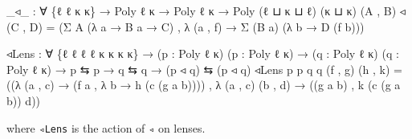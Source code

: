 \documentclass[
  11pt,
  oneside,
  article]{memoir}
\newenvironment{Shaded}{}{}
\newcommand{\NormalTok}[1]{#1}
\newcommand{\OtherTok}[1]{\textcolor[rgb]{0.00,0.44,0.13}{#1}}
\theoremstyle{definition}
\theoremstyle{plain}
\newcommand{\0}{\textsf{0}}
\newcommand{\1}{\tn{\textsf{1}}}
\begin{document}
\begin{Shaded}
\begin{Highlighting}[]
\OtherTok{\_}\NormalTok{◃}\OtherTok{\_} \OtherTok{:} \OtherTok{∀} \OtherTok{\{}\NormalTok{ℓ ℓ\textquotesingle{} κ κ\textquotesingle{}}\OtherTok{\}} \OtherTok{→}\NormalTok{ Poly ℓ κ }\OtherTok{→}\NormalTok{ Poly ℓ\textquotesingle{} κ\textquotesingle{} }\OtherTok{→}\NormalTok{ Poly }\OtherTok{(}\NormalTok{ℓ ⊔ κ ⊔ ℓ\textquotesingle{}}\OtherTok{)} \OtherTok{(}\NormalTok{κ ⊔ κ\textquotesingle{}}\OtherTok{)}
\OtherTok{(}\NormalTok{A , B}\OtherTok{)}\NormalTok{ ◃ }\OtherTok{(}\NormalTok{C , D}\OtherTok{)} \OtherTok{=} \OtherTok{(}\NormalTok{Σ A }\OtherTok{(λ}\NormalTok{ a }\OtherTok{→}\NormalTok{ B a }\OtherTok{→}\NormalTok{ C}\OtherTok{)}\NormalTok{ , }\OtherTok{λ} \OtherTok{(}\NormalTok{a , f}\OtherTok{)} \OtherTok{→}\NormalTok{ Σ }\OtherTok{(}\NormalTok{B a}\OtherTok{)} \OtherTok{(λ}\NormalTok{ b }\OtherTok{→}\NormalTok{ D }\OtherTok{(}\NormalTok{f b}\OtherTok{)))}

\NormalTok{◃Lens }\OtherTok{:} \OtherTok{∀} \OtherTok{\{}\NormalTok{ℓ ℓ\textquotesingle{} ℓ\textquotesingle{}\textquotesingle{} ℓ\textquotesingle{}\textquotesingle{}\textquotesingle{} κ κ\textquotesingle{} κ\textquotesingle{}\textquotesingle{} κ\textquotesingle{}\textquotesingle{}\textquotesingle{}}\OtherTok{\}}
        \OtherTok{→} \OtherTok{(}\NormalTok{p }\OtherTok{:}\NormalTok{ Poly ℓ κ}\OtherTok{)} \OtherTok{(}\NormalTok{p\textquotesingle{} }\OtherTok{:}\NormalTok{ Poly ℓ\textquotesingle{} κ\textquotesingle{}}\OtherTok{)} 
        \OtherTok{→} \OtherTok{(}\NormalTok{q }\OtherTok{:}\NormalTok{ Poly ℓ\textquotesingle{}\textquotesingle{} κ\textquotesingle{}\textquotesingle{}}\OtherTok{)} \OtherTok{(}\NormalTok{q\textquotesingle{} }\OtherTok{:}\NormalTok{ Poly ℓ\textquotesingle{}\textquotesingle{}\textquotesingle{} κ\textquotesingle{}\textquotesingle{}\textquotesingle{}}\OtherTok{)}
        \OtherTok{→}\NormalTok{ p ⇆ p\textquotesingle{} }\OtherTok{→}\NormalTok{ q ⇆ q\textquotesingle{} }\OtherTok{→} \OtherTok{(}\NormalTok{p ◃ q}\OtherTok{)}\NormalTok{ ⇆ }\OtherTok{(}\NormalTok{p\textquotesingle{} ◃ q\textquotesingle{}}\OtherTok{)}
\NormalTok{◃Lens p p\textquotesingle{} q q\textquotesingle{} }\OtherTok{(}\NormalTok{f , g}\OtherTok{)} \OtherTok{(}\NormalTok{h , k}\OtherTok{)} \OtherTok{=}
    \OtherTok{((λ} \OtherTok{(}\NormalTok{a , c}\OtherTok{)} \OtherTok{→} \OtherTok{(}\NormalTok{f a , }\OtherTok{λ}\NormalTok{ b\textquotesingle{} }\OtherTok{→}\NormalTok{ h }\OtherTok{(}\NormalTok{c }\OtherTok{(}\NormalTok{g a b\textquotesingle{}}\OtherTok{))))}
\NormalTok{    , }\OtherTok{λ} \OtherTok{(}\NormalTok{a , c}\OtherTok{)} \OtherTok{(}\NormalTok{b\textquotesingle{} , d\textquotesingle{}}\OtherTok{)} \OtherTok{→} \OtherTok{((}\NormalTok{g a b\textquotesingle{}}\OtherTok{)}\NormalTok{ , k }\OtherTok{(}\NormalTok{c }\OtherTok{(}\NormalTok{g a b\textquotesingle{}}\OtherTok{))}\NormalTok{ d\textquotesingle{}}\OtherTok{))}
\end{Highlighting}
\end{Shaded}
where \texttt{◃Lens} is the action of \texttt{◃} on lenses.
\end{document}
